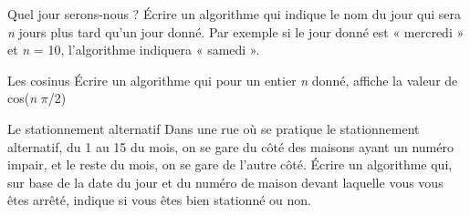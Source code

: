 \begin{Exercice}{Quel jour serons-nous ?}
{
Écrire un algorithme qui indique le nom du jour qui sera \textit{n}
jours plus tard qu’un jour donné. Par exemple si le jour donné est «
mercredi » et \textit{n} = 10, l’algorithme indiquera « samedi ».}
\end{Exercice}

\begin{Exercice}{Les cosinus}
Écrire un algorithme qui pour un entier \textit{n} donné, affiche la
valeur de cos(\textit{n} $\pi $/2)
\end{Exercice}

\begin{Exercice}{Le stationnement alternatif}
{
Dans une rue où se pratique le stationnement alternatif, du 1 au 15 du
mois, on se gare du côté des maisons ayant un numéro impair, et le
reste du mois, on se gare de l'autre côté. Écrire un
algorithme qui, sur base de la date du jour et du numéro de maison
devant laquelle vous vous êtes arrêté, indique si vous êtes bien
stationné ou non. }
\end{Exercice}
